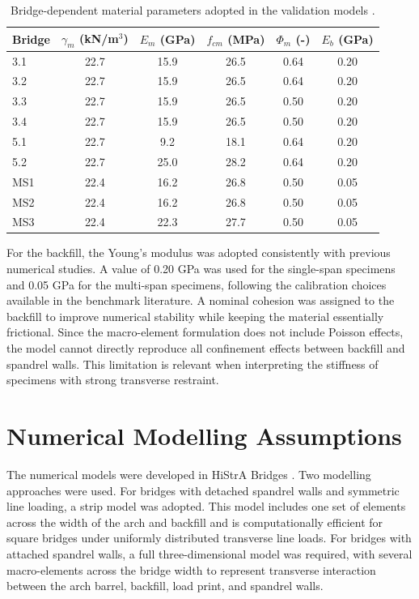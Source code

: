 \begin{table}[htbp]
\centering
\caption{Bridge-dependent material parameters adopted in the validation models \cite{Bonatte2026DMEM}.}
\label{tab:dmem-variable-materials}
\begin{tabular}{lccccc}
\hline
Bridge & $\gamma_m$ (kN/m$^3$) & $E_m$ (GPa) & $f_{cm}$ (MPa) & $\Phi_m$ (-) & $E_b$ (GPa)\\
\hline
3.1 & 22.7 & 15.9 & 26.5 & 0.64 & 0.20\\
3.2 & 22.7 & 15.9 & 26.5 & 0.64 & 0.20\\
3.3 & 22.7 & 15.9 & 26.5 & 0.50 & 0.20\\
3.4 & 22.7 & 15.9 & 26.5 & 0.50 & 0.20\\
5.1 & 22.7 & 9.2 & 18.1 & 0.64 & 0.20\\
5.2 & 22.7 & 25.0 & 28.2 & 0.64 & 0.20\\
MS1 & 22.4 & 16.2 & 26.8 & 0.50 & 0.05\\
MS2 & 22.4 & 16.2 & 26.8 & 0.50 & 0.05\\
MS3 & 22.4 & 22.3 & 27.7 & 0.50 & 0.05\\
\hline
\end{tabular}
\end{table}

For the backfill, the Young's modulus was adopted consistently with previous numerical studies. A value of 0.20 GPa was used for the single-span specimens and 0.05 GPa for the multi-span specimens, following the calibration choices available in the benchmark literature. A nominal cohesion was assigned to the backfill to improve numerical stability while keeping the material essentially frictional. Since the macro-element formulation does not include Poisson effects, the model cannot directly reproduce all confinement effects between backfill and spandrel walls. This limitation is relevant when interpreting the stiffness of specimens with strong transverse restraint.

\section{Numerical Modelling Assumptions}
\label{sec:dmem-validation-modelling}

The numerical models were developed in HiStrA Bridges \cite{HiStrA2022}. Two modelling approaches were used. For bridges with detached spandrel walls and symmetric line loading, a strip model was adopted. This model includes one set of elements across the width of the arch and backfill and is computationally efficient for square bridges under uniformly distributed transverse line loads. For bridges with attached spandrel walls, a full three-dimensional model was required, with several macro-elements across the bridge width to represent transverse interaction between the arch barrel, backfill, load print, and spandrel walls.


